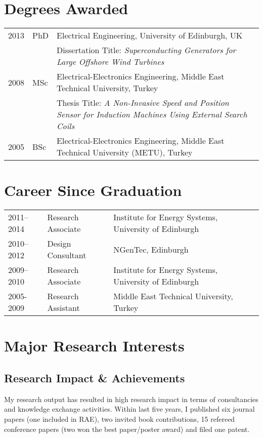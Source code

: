 \documentclass[a4paper,12pt]{article}
\begin{document}
\maketitle
 
\section{Degrees Awarded}
\begin{tabular}{llp{14cm}}
 2013 & PhD & Electrical Engineering, University of Edinburgh, UK\\  
& & Dissertation Title: \textit{Superconducting Generators for Large Offshore Wind Turbines} \\ 
 2008 & MSc & Electrical-Electronics Engineering, Middle East Technical University, Turkey \\
& & Thesis Title: \textit{A Non-Invasive Speed and Position Sensor for Induction Machines Using External Search Coils}\\
 2005 & BSc & Electrical-Electronics Engineering, Middle East Technical University (METU), Turkey \\

\end{tabular}

\section{Career Since Graduation}

\begin{tabular}{lp{3.6cm}l}
2011--2014 & Research Associate & Institute for Energy Systems, University of Edinburgh \\ 
2010--2012 & Design Consultant & NGenTec, Edinburgh\\
2009--2010 & Research Associate & Institute for Energy Systems, University of Edinburgh\\
2005-2009 & Research Assistant & Middle East Technical University, Turkey\\ 
\end{tabular}


\section{Major Research Interests}

\subsection{Research Impact \& Achievements}
My research output has resulted in high research impact in terms of consultancies and knowledge exchange activities. Within last five years, I published six journal papers (one included in RAE), two invited book contributions, 15 refereed conference papers (two won the best paper/poster award) and filed one patent. 
\end{document}
